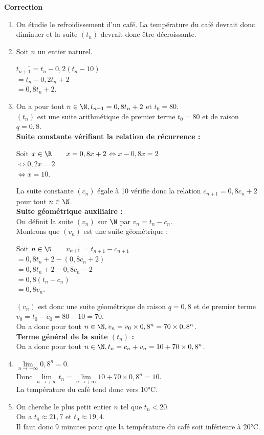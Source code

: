 \documentclass[a4paper,11pt,exos]{nsi} %
\begin{document}
\textcolor{UGLiBlue}{\textbf{Correction}
\begin{enumerate}
    \item On étudie le refroidissement d'un café. La température du café devrait donc diminuer et la suite $(t_n)$ devrait donc être décroissante.
    \item Soit $n$ un entier naturel.
    \begin{tabbing}
        $t_{n+1}$\=$=t_n-0,2(t_n-10)$\\
        \> $=t_n-0,2t_n+2$\\
        \> $=0,8t_n+2$.
    \end{tabbing}
    \item On a pour tout $n\in\N, t_{n+1}=0,8t_n+2$ et $t_0=80$.\\
    $(t_n)$ est une suite arithmétique de premier terme $t_0=80$ et de raison $q=0,8$.\\[.5em]
    \textbf{Suite constante vérifiant la relation de récurrence :} \begin{tabbing}
        Soit $x\in\R \qquad x=0,8x+2$\=$\iff x-0,8x=2$\\
        \>$\iff 0,2x=2$\\
        \>$\iff x=10$.
    \end{tabbing}
    La suite constante $(c_n)$ égale à 10 vérifie donc la relation $c_{n+1}=0,8c_n+2$ pour tout $n\in\N$.\\[.5em]
    \textbf{Suite géométrique auxiliaire :}\\[.5em]
    On définit la suite $(v_n)$ sur $\N$ par $v_n=t_n-c_n$.\\
    Montrons que $(v_n)$ est une suite géométrique :
    \begin{tabbing}
        Soit $n\in\N \qquad v_{n+1}$\=$=t_{n+1}-c_{n+1}$\\
        \> $=0,8t_n+2-(0,8c_n+2)$\\
        \> $=0,8t_n+2-0,8c_n-2$\\
        \> $=0,8(t_n-c_n)$\\
        \> $=0,8v_n$.
    \end{tabbing}
    $(v_n)$ est donc une suite géométrique de raison $q=0,8$ et de premier terme $v_0=t_0-c_0=80-10=70$.\\
    On a donc pour tout $n\in\N, v_n=v_0\times 0,8^n=70\times 0,8^n$.\\[.5em]
    \textbf{Terme général de la suite $(t_n)$ :}\\[.5em]
    On a donc pour tout $n\in\N, t_n=c_n+v_n=10+70\times 0,8^n$.
    \item $\lim\limits_{n\to+\infty}0,8^n=0$.\\[.5em]
    Donc $\lim\limits_{n\to+\infty} t_n=\lim\limits_{n\to+\infty}10+70\times 0,8^n=10$.\\[.5em]
    La température du café tend donc vers 10°C.
    \item On cherche le plus petit entier $n$ tel que $t_n<20$.\\
    On a $t_8\approx 21,7$ et $t_9\approx 19,4$.\\
    Il faut donc 9 minutes pour que la température du café soit inférieure à 20°C.
\end{enumerate}}
\end{document}
